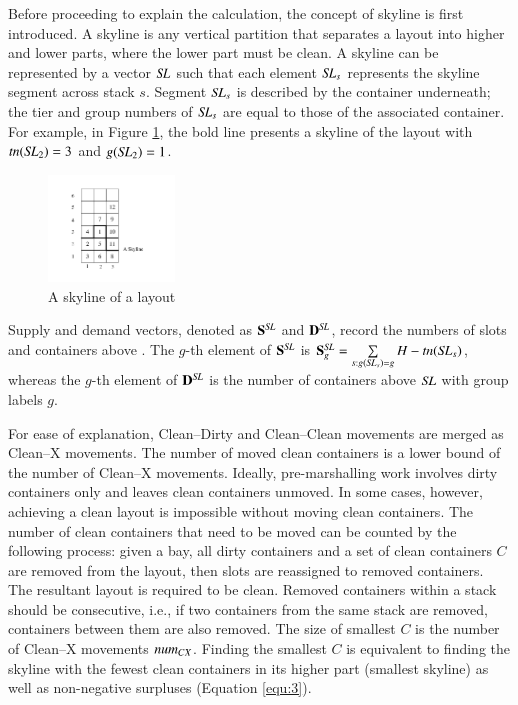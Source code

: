 \documentclass[review,3p,times,authoryear,12pt]{elsarticle}
\begin{document}
Before proceeding to explain the calculation, the concept of skyline is first introduced. A skyline is any vertical partition that separates a layout into higher and lower parts, where the lower part must be clean. A skyline can be represented by a vector $\id{SL}$ such that each element $\id{SL}_s$ represents the skyline segment across stack $s$. Segment $\id{SL}_s$ is described by the container underneath; the tier and group numbers of $\id{SL}_s$ are equal to those of the associated container. For example, in Figure \ref{fig5}, the bold line presents a skyline of the layout with $\id{tn}(\id{SL}_{2})=3$ and $g(\id{SL}_{2})=1$.


\begin{figure}[htbp]
\centering
\includegraphics[width=0.3\textwidth]{fig5.pdf}
\caption{A skyline of a layout}
\label{fig5}
\end{figure}

Supply and demand vectors, denoted as $\mathbf S^\id{SL}$ and $\mathbf D^\id{SL}$, record the numbers of slots and containers above . The $g$-th element of $\mathbf S^\id{SL}$ is $\mathbf S^\id{SL}_g=\sum\limits_{s:g(\id{SL}_s)=g}H-\id{tn}(\id{SL}_s)$, whereas the $g$-th element of $\mathbf D^\id{SL}$ is the number of containers above $\id{SL}$ with group labels $g$.

For ease of explanation, Clean--Dirty and Clean--Clean movements are merged as Clean--X movements. The number of moved clean containers is a lower bound of the number of Clean--X movements. Ideally, pre-marshalling work involves dirty containers only and leaves clean containers unmoved. In some cases, however, achieving a clean layout is impossible without moving clean containers. The number of clean containers that need to be moved can be counted by the following process: given a bay, all dirty containers and a set of clean containers $C$ are removed from the layout, then slots are reassigned to removed containers. The resultant layout is required to be clean. Removed containers within a stack should be consecutive, i.e., if two containers from the same stack are removed, containers between them are also removed. The size of smallest $C$ is the number of Clean--X movements $\id{num}_{CX}$. Finding the smallest $C$ is equivalent to finding the skyline with the fewest clean containers in its higher part (smallest skyline) as well as non-negative surpluses (Equation \ref{equ:3}).
\end{document}
